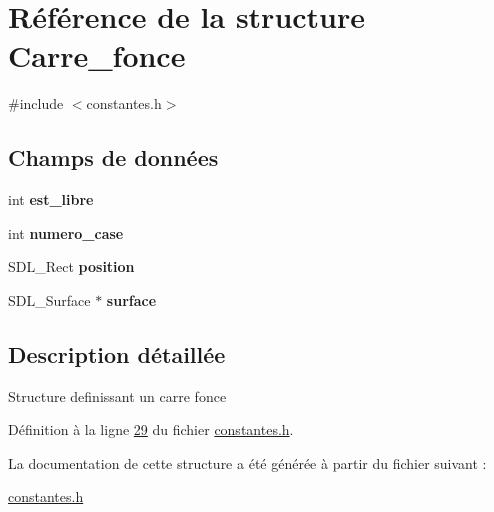 \hypertarget{struct_carre__fonce}{
\section{Référence de la structure Carre\_\-fonce}
\label{struct_carre__fonce}
}


{\ttfamily \#include $<$constantes.h$>$}

\subsection*{Champs de données}
\begin{DoxyCompactItemize}
\item 
\hypertarget{struct_carre__fonce_a173f25d2fd7c653d77ca8174ba4f636d}{
int {\bfseries est\_\-libre}}
\label{struct_carre__fonce_a173f25d2fd7c653d77ca8174ba4f636d}

\item 
\hypertarget{struct_carre__fonce_ae7469189d260b9609e5e1c4d1b0b7ed4}{
int {\bfseries numero\_\-case}}
\label{struct_carre__fonce_ae7469189d260b9609e5e1c4d1b0b7ed4}

\item 
\hypertarget{struct_carre__fonce_ac06cf6a292dc0e70e28b394fa481aef2}{
SDL\_\-Rect {\bfseries position}}
\label{struct_carre__fonce_ac06cf6a292dc0e70e28b394fa481aef2}

\item 
\hypertarget{struct_carre__fonce_a2f5cac12e913bcfcff660305bf88dd3b}{
SDL\_\-Surface $\ast$ {\bfseries surface}}
\label{struct_carre__fonce_a2f5cac12e913bcfcff660305bf88dd3b}

\end{DoxyCompactItemize}


\subsection{Description détaillée}
Structure definissant un carre fonce 

Définition à la ligne \hyperlink{constantes_8h_source_l00029}{29} du fichier \hyperlink{constantes_8h_source}{constantes.h}.



La documentation de cette structure a été générée à partir du fichier suivant :\begin{DoxyCompactItemize}
\item 
\hyperlink{constantes_8h}{constantes.h}\end{DoxyCompactItemize}
